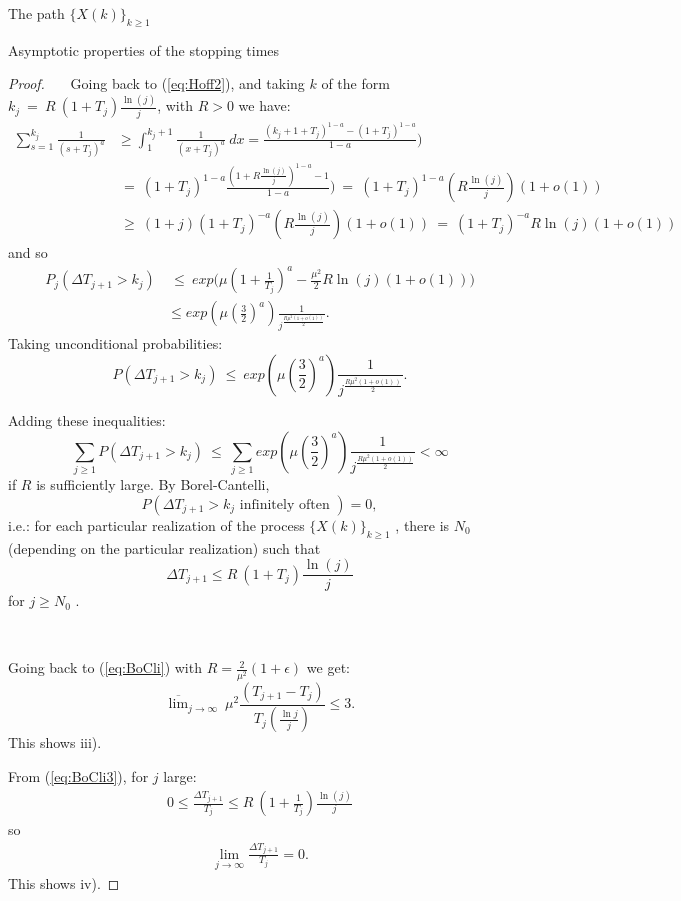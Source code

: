\documentclass[12pt]{article}
\begin{document}
\begin{section}{The path $\{X(k)\}_{k\ge1}$ }
\begin{subsection}{Asymptotic properties of the stopping times}
\begin{proof}
\   
\   
\   
Going back to (\ref{eq:Hoff2}), and taking $k$ of the form $k_j ~=~ R \ (1+T_j) \frac{\ln(j)}{j}$, with $R>0$ we have:
\begin{align*}
\sum_{s=1}^{k_j} \frac{1}{{(s+T_j)}^a} &\ge \int_{1}^{k_j+1} \frac{1}{{(x+T_j)}^a} \ dx = \frac{(k_j+1+T_j)^{1-a} - (1+T_j)^{1-a}}{1-a}) \\
&~=~ (1+T_j)^{1-a} \frac{( 1 + R \frac{\ln(j)}{j})^{1-a} - 1}{1-a})  ~=~
(1+T_j)^{1-a} ( R \frac{\ln(j)}{j}) (1+ o(1)) \\
&~\ge~  (1+j)(1+T_j)^{-a} ( R \frac{\ln(j)}{j}) (1+ o(1)) ~=~ 
 (1+T_j)^{-a} R \ln(j) (1+ o(1))
\end{align*}
and so
\begin{align*} 
P_j\left( \Delta T_{j+1} > k_j \right) &~\le~
exp\Big( \mu  (1 + \frac{1}{T_j})^a 
- \frac{\mu^2 }{2} R \ln(j) (1+ o(1))  \Big) \\
&\le exp( \mu  (\frac{3}{2})^a ) 
\frac{1}{ j^{\frac{R\mu^2(1+ o(1)) }{2}} }.
\end{align*} Taking unconditional probabilities:
\begin{equation*} 
P\left( \Delta T_{j+1} > k_j \right) ~\le~
 exp( \mu  (\frac{3}{2})^a ) 
\frac{1}{ j^{\frac{R\mu^2(1+ o(1)) }{2}} }.
\end{equation*}

Adding these inequalities:
\begin{equation} \label{eq:BoCli}
\sum_{j\ge1}  P\left( \Delta T_{j+1} > k_j \right) ~\le~
 \sum_{j\ge1} exp( \mu  (\frac{3}{2})^a ) 
\frac{1}{ j^{\frac{R\mu^2(1+ o(1)) }{2}} } < \infty
\end{equation}
if $R$ is sufficiently large. By Borel-Cantelli, 
\begin{equation} \label{eq:BoCli2}
 P\left( \Delta T_{j+1} > k_j \text{ infinitely often }\right) =0 ,
\end{equation} i.e.: for each particular realization of the process $\{X(k)\}_{k\ge1}$ , there is $N_0$ (depending on the particular realization) such that 
\begin{equation} \label{eq:BoCli3}
\Delta T_{j+1} \le R \ (1+T_j) \frac{\ln(j)}{j} 
\end{equation} 
for $j\ge N_0$ . 
\

\

Going back to (\ref{eq:BoCli}) with $R =  \frac{2}{\mu^2}(1+\epsilon)$ we get:
$$
\overline{\lim}_{j \rightarrow \infty } \ \mu^2 
\frac{(T_{j+1}-T_j)}{ T_j (\frac{\ln j}{j})} \le 3.
$$
This shows iii).

From (\ref{eq:BoCli3}), for $j$ large:
\begin{align*}
0 \le \frac{\Delta T_{j+1} }{T_j} \le R \ (1+\frac{1}{T_j}) \frac{\ln(j)}{j}
\end{align*}
so
\begin{align*}
\lim_{j \rightarrow \infty} \frac{\Delta T_{j+1} }{T_j} = 0. 
\end{align*}
This shows iv).



\end{proof}
\end{subsection}
\end{section}
\end{document}
